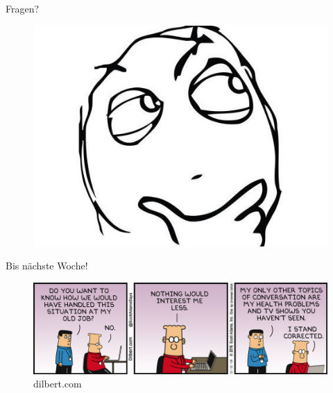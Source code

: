 \documentclass[18pt]{beamer}
\begin{document}
\begin{frame}{Fragen?}
    \begin{figure}
        \includegraphics[scale=.32]{img/Question-Rage-Face.jpg}
    \end{figure}
\end{frame}

\begin{frame}{Bis nächste Woche!}
    \begin{figure}
        \includegraphics[scale=.32]{img/dt161111.jpg}
        \caption{\footnotesize{dilbert.com}}
    \end{figure}
\end{frame}

\backupend
\end{document}
